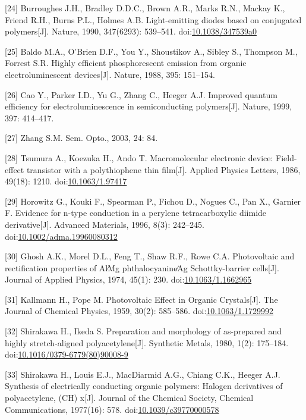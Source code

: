 \documentclass[12pt,]{report}
\begin{document}
{[}24{]} Burroughes J.H., Bradley D.D.C., Brown A.R., Marks R.N., Mackay
K., Friend R.H., Burns P.L., Holmes A.B. Light-emitting diodes based on
conjugated polymers{[}J{]}. Nature, 1990, 347(6293): 539--541.
doi:\href{http://dx.doi.org/10.1038/347539a0}{10.1038/347539a0}

{[}25{]} Baldo M.A., O'Brien D.F., You Y., Shoustikov A., Sibley S.,
Thompson M., Forrest S.R. Highly efficient phosphorescent emission from
organic electroluminescent devices{[}J{]}. Nature, 1988, 395: 151--154.

{[}26{]} Cao Y., Parker I.D., Yu G., Zhang C., Heeger A.J. Improved
quantum efficiency for electroluminescence in semiconducting
polymers{[}J{]}. Nature, 1999, 397: 414--417.

{[}27{]} Zhang S.M. Sem. Opto., 2003, 24: 84.

{[}28{]} Tsumura A., Koezuka H., Ando T. Macromolecular electronic
device: Field-effect transistor with a polythiophene thin film{[}J{]}.
Applied Physics Letters, 1986, 49(18): 1210.
doi:\href{http://dx.doi.org/10.1063/1.97417}{10.1063/1.97417}

{[}29{]} Horowitz G., Kouki F., Spearman P., Fichou D., Nogues C., Pan
X., Garnier F. Evidence for n-type conduction in a perylene
tetracarboxylic diimide derivative{[}J{]}. Advanced Materials, 1996,
8(3): 242--245.
doi:\href{http://dx.doi.org/10.1002/adma.19960080312}{10.1002/adma.19960080312}

{[}30{]} Ghosh A.K., Morel D.L., Feng T., Shaw R.F., Rowe C.A.
Photovoltaic and rectification properties of Al∕Mg phthalocyanine∕Ag
Schottky-barrier cells{[}J{]}. Journal of Applied Physics, 1974, 45(1):
230. doi:\href{http://dx.doi.org/10.1063/1.1662965}{10.1063/1.1662965}

{[}31{]} Kallmann H., Pope M. Photovoltaic Effect in Organic
Crystals{[}J{]}. The Journal of Chemical Physics, 1959, 30(2): 585--586.
doi:\href{http://dx.doi.org/10.1063/1.1729992}{10.1063/1.1729992}

{[}32{]} Shirakawa H., Ikeda S. Preparation and morphology of
as-prepared and highly stretch-aligned polyacetylene{[}J{]}. Synthetic
Metals, 1980, 1(2): 175--184.
doi:\href{http://dx.doi.org/10.1016/0379-6779(80)90008-9}{10.1016/0379-6779(80)90008-9}

{[}33{]} Shirakawa H., Louis E.J., MacDiarmid A.G., Chiang C.K., Heeger
A.J. Synthesis of electrically conducting organic polymers: Halogen
derivatives of polyacetylene, (CH) x{[}J{]}. Journal of the Chemical
Society, Chemical Communications, 1977(16): 578.
doi:\href{http://dx.doi.org/10.1039/c39770000578}{10.1039/c39770000578}
\end{document}
